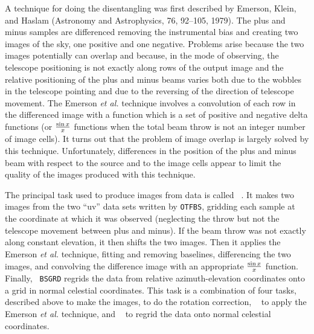      A technique for doing the disentangling was first described by
Emerson, Klein, and Haslam (Astronomy and Astrophysics, 76, 92--105,
1979).  The plus and minus samples are differenced removing the
instrumental bias and creating two images of the sky, one positive and
one negative.  Problems arise because the two images potentially can
overlap and because, in the  mode of observing, the
telescope positioning is not exactly along rows of the output image
and the relative positioning of the plus and minus beams varies both
due to the wobbles in the telescope pointing and due to the reversing
of the direction of telescope movement.  The Emerson {\it et al.}
technique involves a convolution of each row in the differenced image
with a function which is a set of positive and negative delta
functions (or ${\sin x}\over{x}$ functions when the total beam throw
is not an integer number of image cells).  It turns out that the
problem of image overlap is largely solved by this technique.
Unfortunately, differences in the position of the plus and minus beam
with respect to the source and to the image cells appear to limit the
quality of the images produced with this technique.

     The principal task used to produce images from
 data is called \hbox{{\tt
{}}}.  It makes two images from the two ``uv'' data sets
written by {\tt OTFBS}, gridding each sample at the coordinate at
which it was observed (neglecting the throw but not the telescope
movement between plus and minus).  If the beam throw was not exactly
along constant elevation, it then shifts the two images.  Then it
applies the Emerson {\it et al.} technique, fitting and removing
baselines, differencing the two images, and convolving the difference
image with an appropriate ${\sin x}\over{x}$ function.  Finally, {\tt
BSGRD} regrids the data from relative azimuth-elevation coordinates
onto a grid in normal celestial coordinates.  This task is a
combination of four tasks, {\tt {}} described above to make
the images, {\tt {}} to do the rotation correction, {\tt
{}} to apply the Emerson {\it et al.} technique, and {\tt
{}} to regrid the data onto normal celestial coordinates.

